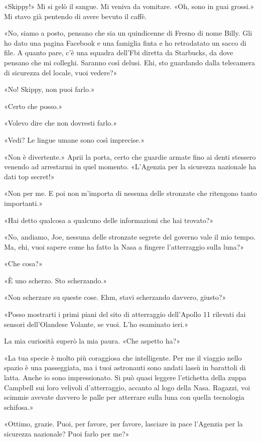 «Skippy!» Mi si gelò il sangue. Mi veniva da vomitare. «Oh, sono in guai
grossi.» Mi stavo già pentendo di avere bevuto il caffè.

«No, siamo a posto, pensano che sia un quindicenne di Fresno di nome
Billy. Gli ho dato una pagina Facebook e una famiglia finta e ho
retrodatato un sacco di file. A quanto pare, c'è una squadra dell'Fbi
diretta da Starbucks, da dove pensano che mi colleghi. Saranno così
delusi. Ehi, sto guardando dalla telecamera di sicurezza del locale,
vuoi vedere?»

«No! Skippy, non puoi farlo.»

«Certo che posso.»

«Volevo dire che non dovresti farlo.»

«Vedi? Le lingue umane sono così imprecise.»

«Non è divertente.» Aprii la porta, certo che guardie armate fino ai
denti stessero venendo ad arrestarmi in quel momento. «L'Agenzia per la
sicurezza nazionale ha dati top secret!»

«Non per me. E poi non m'importa di nessuna delle stronzate che
ritengono tanto importanti.»

«Hai detto qualcosa a qualcuno delle informazioni che hai trovato?»

«No, andiamo, Joe, nessuna delle stronzate segrete del governo vale il
mio tempo. Ma, ehi, vuoi sapere come ha fatto la Nasa a fingere
l'atterraggio sulla luna?»

«Che cosa?»

«È uno scherzo. Sto scherzando.»

«Non scherzare su queste cose. Ehm, stavi scherzando davvero, giusto?»

«Posso mostrarti i primi piani del sito di atterraggio dell'Apollo 11
rilevati dai sensori dell'Olandese Volante, se vuoi. L'ho esaminato
ieri.»

La mia curiosità superò la mia paura. «Che aspetto ha?»

«La tua specie è molto più coraggiosa che intelligente. Per me il
viaggio nello spazio è una passeggiata, ma i tuoi astronauti sono andati
lassù in barattoli di latta. Anche io sono impressionato. Si può quasi
leggere l'etichetta della zuppa Campbell sui loro velivoli
d'atterraggio, accanto al logo della Nasa. Ragazzi, voi scimmie avevate
davvero le palle per atterrare sulla luna con quella tecnologia
schifosa.»

«Ottimo, grazie. Puoi, per favore, per favore, lasciare in pace
l'Agenzia per la sicurezza nazionale? Puoi farlo per me?»

